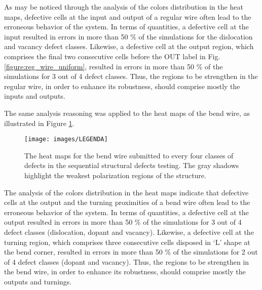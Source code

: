As may be noticed through the analysis of the colors distribution in the heat maps, defective cells at the input and output of a regular wire often lead to the erroneous behavior of the system. In terms of quantities, a defective cell at the input resulted in errors in more than 50 \% of the simulations for the dislocation and vacancy defect classes. Likewise,  a defective cell at the output region, which comprises the final two consecutive cells before the OUT label in Fig. \ref{figure:reg_wire_uniform}, resulted in errors in more than 50 \% of the simulations for 3 out of 4 defect classes. Thus, the regions to be strengthen in the regular wire, in order to enhance its robustness, should comprise mostly the inputs and outputs.

The same analysis reasoning was applied to the heat maps of the bend wire, as illustrated in Figure \ref{figure:reg_bentwire_uniform}.

\begin{figure}[!ht]
\center
{}
\hfill
{}
\hfill
{}
\hfill
{}
\linebreak
{\texttt{[image: images/LEGENDA]}
}
\caption{The heat maps for the bend wire submitted to every four classes of defects in the sequential structural defects testing. The gray shadows highlight the weakest polarization regions of the structure.}
\label{figure:reg_bentwire_uniform}
\end{figure}

The analysis of the colors distribution in the heat maps indicate that defective cells at the output and the turning proximities of a bend wire often lead to the erroneous behavior of the system. In terms of quantities, a defective cell at the output resulted in errors in more than 50 \% of the simulations for 3 out of 4 defect classes (dislocation, dopant and vacancy). Likewise, a defective cell at the turning region, which comprises three consecutive cells disposed in `L' shape at the bend corner, resulted in errors in more than 50 \% of the simulations for 2 out of 4 defect classes (dopant and vacancy). Thus, the regions to be strengthen in the bend wire, in order to enhance its robustness, should comprise mostly the outputs and turnings.

